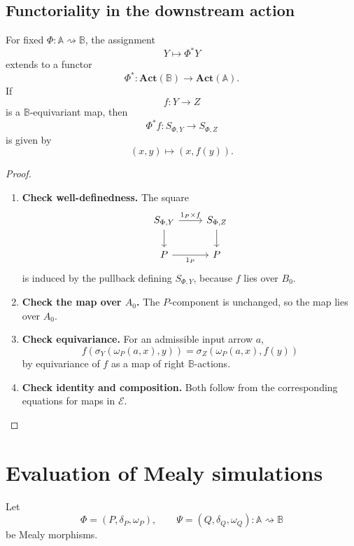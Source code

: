 \subsection{Functoriality in the downstream action}
\label{subsec:relative-functoriality-downstream-action}

\begin{proposition}
\label{prop:relative-functoriality-downstream-action}
For fixed \(\Phi:\mathbb A\rightsquigarrow\mathbb B\), the assignment
\[
Y\longmapsto \Phi^\ast Y
\]
extends to a functor
\[
\Phi^\ast:\mathbf{Act}(\mathbb B)\to\mathbf{Act}(\mathbb A).
\]
If
\[
f:Y\to Z
\]
is a \(\mathbb B\)-equivariant map, then
\[
\Phi^\ast f:S_{\Phi,Y}\to S_{\Phi,Z}
\]
is given by
\[
(x,y)\longmapsto(x,f(y)).
\]
\end{proposition}

\begin{proof}
\leavevmode
\begin{enumerate}
\item \textbf{Check well-definedness.}
The square
\[
\begin{tikzcd}
S_{\Phi,Y}
\arrow[r,"1_P\times f"]
\arrow[d]
&
S_{\Phi,Z}
\arrow[d]
\\
P
\arrow[r,"1_P"']
&
P
\end{tikzcd}
\]
is induced by the pullback defining \(S_{\Phi,Y}\), because \(f\) lies over
\(B_0\).

\item \textbf{Check the map over \(A_0\).}
The \(P\)-component is unchanged, so the map lies over \(A_0\).

\item \textbf{Check equivariance.}
For an admissible input arrow \(a\),
\[
f(\sigma_Y(\omega_P(a,x),y))
=
\sigma_Z(\omega_P(a,x),f(y))
\]
by equivariance of \(f\) as a map of right \(\mathbb B\)-actions.

\item \textbf{Check identity and composition.}
Both follow from the corresponding equations for maps in \(\mathcal E\).
\end{enumerate}
\end{proof}

\section{Evaluation of Mealy simulations}
\label{sec:relative-evaluation-mealy-simulations}

Let
\[
\Phi=(P,\delta_P,\omega_P),
\qquad
\Psi=(Q,\delta_Q,\omega_Q)
:
\mathbb A\rightsquigarrow\mathbb B
\]
be Mealy morphisms.

